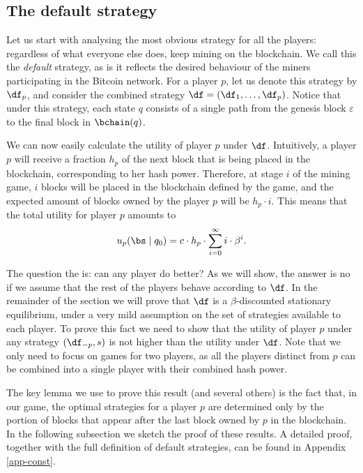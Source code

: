 \subsection{The default strategy}

Let us start with analysing the most obvious strategy for all the players: regardless of what everyone else does, keep mining on the blockchain. We call this 
the \emph{default} strategy, as is it reflects the desired behaviour of the miners participating in the Bitcoin network. For a player $p$, let us denote this strategy 
by $\df_p$, and consider the combined strategy $\df = (\df_1,\dots,\df_p)$. Notice that under this strategy, each state $q$ consists of a single path from the genesis block $\varepsilon$ to the final block in $\bchain(q)$.

We can now easily calculate the utility of player $p$ under $\df$. Intuitively, a player $p$ will receive a fraction $h_p$ of the next block that is being placed in the blockchain, corresponding to her hash power. Therefore, at stage $i$ of the mining game, $i$ blocks will be placed in the blockchain defined by the game, and the expected amount of blocks owned by the player $p$ will be $h_p\cdot i$. This means that the total utility for player $p$ amounts to $$u_p(\bs \mid q_0) = c\cdot h_p \cdot \sum_{i=0}^{\infty}i \cdot \beta^{i}.$$ %

The question the is: can any player do better? As we will show, the answer is no if we assume that the rest of the players behave according to $\df$. In the remainder of the section we 
will prove that $\df$ is a $\beta$-discounted stationary equilibrium, under a very mild assumption on the set of strategies available to each player. 
To prove this fact we need to show that the utility of player $p$ under any strategy $(\df_{-p},s)$ is not higher than the utility under $\df$. Note that we only need to focus on 
games for two players, as all the players distinct from $p$ can be combined into a single player with their combined hash power. 

The key lemma we use to prove this result (and several others) is the fact that, in our game, the optimal strategies for a player $p$ are determined only by the portion 
of blocks that appear after the last block owned by $p$ in the blockchain. In the following subsection we sketch the proof of these results. A detailed proof, together with the full definition of default strategies, can be found in Appendix \ref{app-const}.

